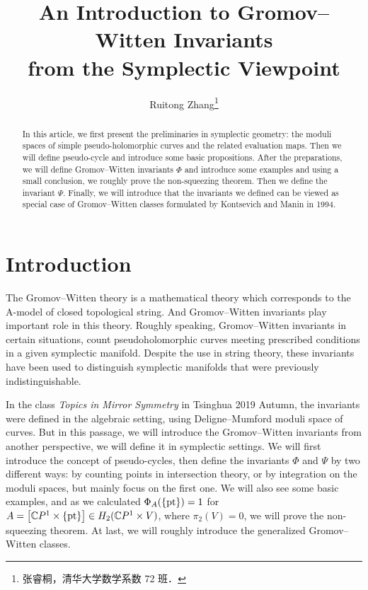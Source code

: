 \documentclass[twoside]{article}
\begin{document}
\title{An Introduction to Gromov--Witten Invariants\\from the Symplectic Viewpoint}
\author{Ruitong Zhang\footnote{张睿桐，清华大学数学系数 72 班．}}

\begin{abstract}
    In this article, we first present the preliminaries in symplectic geometry: 
    the moduli spaces of simple pseudo-holomorphic curves and the related evaluation maps. 
    Then we will define pseudo-cycle and introduce some basic propositions. 
    After the preparations, we will define Gromov--Witten invariants $\Phi$ 
    and introduce some examples and using a small conclusion, 
    we roughly prove the non-squeezing theorem. 
    Then we define the invariant $\Psi$. Finally, 
    we will introduce that the invariants we defined can be viewed 
    as special case of Gromov--Witten classes formulated by Kontsevich and Manin in 1994.
\end{abstract}

\tableofcontents

\section{Introduction}
The Gromov--Witten theory is a mathematical theory which corresponds to 
the A-model of closed topological string. 
And Gromov--Witten invariants play important role in this theory. 
Roughly speaking, Gromov--Witten invariants in certain situations, 
count pseudoholomorphic curves meeting prescribed conditions in a given symplectic manifold. 
Despite the use in string theory, 
these invariants have been used to distinguish symplectic manifolds that were previously indistinguishable.

In the class \emph{Topics in Mirror Symmetry} in Tsinghua 2019 Autumn, 
the invariants were defined in the algebraic setting, 
using Deligne--Mumford moduli space of curves. 
But in this passage, we will introduce the Gromov--Witten invariants from another perspective, 
we will define it in symplectic settings. 
We will first introduce the concept of pseudo-cycles, 
then define the invariants $\Phi$ and $\Psi$ by two different ways: 
by counting points in intersection theory, 
or by integration on the moduli spaces, but mainly focus on the first one. 
We will also see some basic examples, and as we calculated $\Phi_A(\{\operatorname{pt}\})=1$ 
for $A=\left[\mathbb{C}P^{1}\times\{\operatorname{pt}\} \right]\in H_2(\mathbb{C}P^{1}\times V)$, 
where $\pi_2(V)=0$, we will prove the non-squeezing theorem. 
At last, we will roughly introduce the generalized Gromov--Witten classes.
\end{document}
